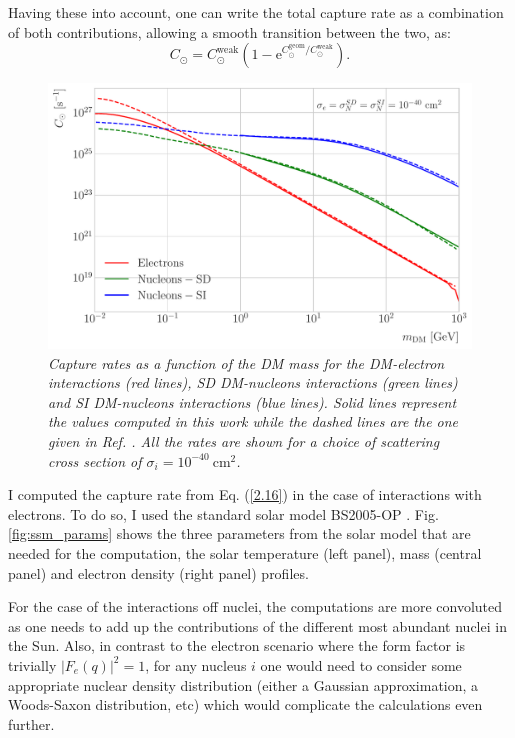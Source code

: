 Having these into account, one can write the total capture rate as a combination of both contributions, allowing a smooth transition between the two, as:
\begin{equation}\label{2.16}
	C_{\odot} = C_{\odot}^{\mathrm{weak}} \left(1-\mathrm{e}^{C_{\odot}^{\mathrm{geom}}/C_{\odot}^{\mathrm{weak}}}\right).
\end{equation}

\begin{figure}[t]
	\centering
	\includegraphics[width=0.9\linewidth]{Images/DM_Analysis/capture_rates.pdf}
	\caption{\textit{Capture rates as a function of the DM mass for the DM-electron interactions (red lines), SD DM-nucleons interactions (green lines) and SI DM-nucleons interactions (blue lines). Solid lines represent the values computed in this work while the dashed lines are the one given in Ref. \cite{Palomares2017}. All the rates are shown for a choice of scattering cross section of $\sigma_{i} = 10^{-40} \ \mathrm{cm}^{2}$.}}
	\label{fig:capture_rates}
\end{figure}

I computed the capture rate from Eq. (\ref{2.16}) in the case of interactions with electrons. To do so, I used the standard solar model BS2005-OP \cite{Bahcall2004}. Fig. \ref{fig:ssm_params} shows the three parameters from the solar model that are needed for the computation, the solar temperature (left panel), mass (central panel) and electron density (right panel) profiles.

For the case of the interactions off nuclei, the computations are more convoluted as one needs to add up the contributions of the different most abundant nuclei in the Sun. Also, in contrast to the electron scenario where the form factor is trivially $|F_{e}(q)|^{2} = 1$, for any nucleus $i$ one would need to consider some appropriate nuclear density distribution (either a Gaussian approximation, a Woods-Saxon distribution, etc) which would complicate the calculations even further.

